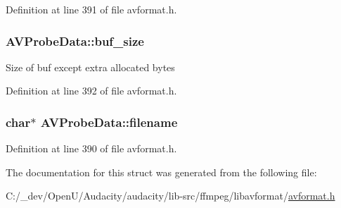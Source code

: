 Definition at line 391 of file avformat.\+h.

\subsubsection[{\texorpdfstring{buf\+\_\+size}{buf_size}}]{ A\+V\+Probe\+Data\+::buf\+\_\+size}\hypertarget{struct_a_v_probe_data_a30309e4de25c1a411c635eab767e1e53}{}\label{struct_a_v_probe_data_a30309e4de25c1a411c635eab767e1e53}
Size of buf except extra allocated bytes 

Definition at line 392 of file avformat.\+h.

\subsubsection[{\texorpdfstring{filename}{filename}}]{ char$\ast$ A\+V\+Probe\+Data\+::filename}\hypertarget{struct_a_v_probe_data_a0e8504127aff8af25cc9f3c6400b9651}{}\label{struct_a_v_probe_data_a0e8504127aff8af25cc9f3c6400b9651}


Definition at line 390 of file avformat.\+h.



The documentation for this struct was generated from the following file\+:\begin{DoxyCompactItemize}
\item 
C\+:/\+\_\+dev/\+Open\+U/\+Audacity/audacity/lib-\/src/ffmpeg/libavformat/\hyperlink{avformat_8h}{avformat.\+h}\end{DoxyCompactItemize}
